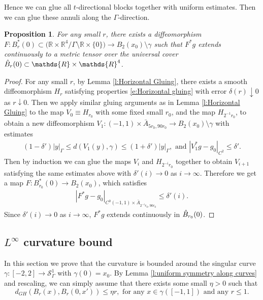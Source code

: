 \documentclass[11pt,reqno]{amsart}
\numberwithin{equation}{section}
\newcommand{\RR}{\mathds{R}}
\newcommand{\cS}{\mathcal{S}}
\newtheorem{prop}[thm]{Proposition}
\theoremstyle{definition}
\theoremstyle{remark}
\begin{document}
Hence we can glue all $t$-directional blocks together with uniform estimates. Then we can glue these annuli along the $\Gamma$-direction.

\begin{prop}\label{prop:C^0 metric}
    For any small $r$, there exists a diffeomorphism $F: B^*_r(0) \subset \big(\RR \times \RR^4/\Gamma \setminus \RR \times \{0\}\big) \to B_2(x_0) \setminus \gamma$ such that $F^*g$ extends continuously to a metric tensor over the universal cover $\Hat{B}_r(0) \subset \RR \times \RR^4$. 
\end{prop}

\begin{proof}
    For any small $r$, by Lemma \ref{l:Horizontal Gluing}, there exists a smooth diffeomorphism $H_r$ satisfying properties \eqref{e:Horizontal gluing} with error $\delta(r) \downarrow 0$ as $r\downarrow 0$. Then we apply similar gluing arguments as in Lemma \ref{l:Horizontal Gluing} to the map $V_0\equiv H_{r_0}$ with some fixed small $r_0$, and the map $H_{2^{-1}r_0}$, to obtain a new diffeomorphism $V_1: (-1,1) \times \bar{A}_{5r_0, 90r_0} \to B_2(x_0) \setminus \gamma$ with estimates
    \begin{align*}
        (1- \delta') |y|_{\Gamma} \leqslant d(V_1(y), \gamma) \leqslant (1+\delta') |y|_{\Gamma}, \text{ and } |V_1^{*} g  - g_0|_{C^2} \leqslant \delta'.
    \end{align*}
    Then by induction we can glue the maps $V_i$ and $H_{2^{-{i}}r_0}$ together to obtain $V_{i+1}$ satisfying the same estimates above with $\delta'(i) \to 0$ as $i \to \infty$. Therefore we get a map $F: B^*_{r_0}(0) \to B_2(x_0)$, which satisfies 
    \begin{align*}
        |F^*g - g_0|_{C^0(-1,1) \times \bar{A}_{2^{-i}r_0,90r_0}} \leqslant \delta'(i).
    \end{align*}
    Since $\delta'(i) \to 0$ as $i \to \infty$, $F^*g$ extends continuously in $\Hat{B}_{r_0}(0)$. 
\end{proof}

\subsection{$L^{\infty}$ curvature bound}\label{s:curvature estimate}

In this section we prove that the curvature is bounded around the singular curve $\gamma:[-2,2] \to \cS^1_{\Gamma}$ with $\gamma(0)=x_0$. By Lemma \ref{l:uniform symmetry along curves} and rescaling, we can simply assume that there exists some small $\eta>0$ such that
\begin{equation}
        d_{GH}(B_r(x), B_r(0,x')) \leqslant \eta r, \text{ for any } x \in \gamma([-1,1]) \text{ and any } r \leqslant 1.
    \end{equation}
\end{document}

